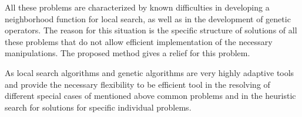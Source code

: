 \documentclass[11pt]{article}
\begin{document}
All these problems are characterized by known difficulties in developing a neighborhood function for local search, as well as in the development of genetic operators. The reason for this situation is the specific structure of solutions of all these problems that do not allow efficient implementation of the necessary manipulations. The proposed method gives a relief for this problem.

As local search algorithms and genetic algorithms are very highly adaptive tools and provide the necessary flexibility to be efficient tool in the resolving of different special cases of mentioned above common problems and in the heuristic search for solutions for specific individual problems. 



\end{document}
